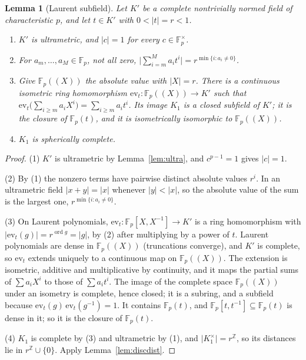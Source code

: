\documentclass[11pt]{amsart}
\newtheorem{lemma}[theorem]{Lemma}
\theoremstyle{definition}
\theoremstyle{remark}
\numberwithin{equation}{section}
\newcommand{\Z}{\mathbb{Z}}
\newcommand{\F}{\mathbb{F}}
\newcommand{\ord}{\operatorname{ord}}
\newcommand{\abs}[1]{\lvert #1\rvert}
\begin{document}
\begin{lemma}[Laurent subfield]\label{lem:laurentsub}
Let $K'$ be a complete nontrivially normed field of characteristic $p$, and let $t\in K'$ with $0<\abs t=r<1$.
\begin{enumerate}
\item $K'$ is ultrametric, and $\abs c=1$ for every $c\in\F_p^\times$.
\item For $a_m,\dots,a_M\in\F_p$, not all zero, $\bigl\lvert\sum_{i=m}^Ma_it^i\bigr\rvert=r^{\min\{i:a_i\ne0\}}$.
\item Give $\F_p((X))$ the absolute value with $\abs X=r$. There is a continuous isometric ring homomorphism
$\mathrm{ev}_t\colon\F_p((X))\to K'$ such that
$\mathrm{ev}_t\bigl(\sum_{i\ge m}a_iX^i\bigr)=\sum_{i\ge m}a_it^i$. Its image
$K_1$ is a closed subfield of $K'$; it is the closure of $\F_p(t)$, and it is isometrically isomorphic to $\F_p((X))$.
\item $K_1$ is spherically complete.
\end{enumerate}
\end{lemma}

\begin{proof}
(1) $K'$ is ultrametric by Lemma~\ref{lem:ultra}, and $c^{p-1}=1$ gives $\abs c=1$.

(2) By (1) the nonzero terms have pairwise distinct absolute values $r^i$. In an ultrametric field $\abs{x+y}=\abs x$
whenever $\abs y<\abs x$, so the absolute value of the sum is the largest one, $r^{\min\{i:a_i\neq0\}}$.

(3) On Laurent polynomials, $\mathrm{ev}_t\colon\F_p[X,X^{-1}]\to K'$ is a ring homomorphism with
$\abs{\mathrm{ev}_t(g)}=r^{\ord g}=\abs g$, by (2) after multiplying by a power of $t$. Laurent polynomials are dense in
$\F_p((X))$ (truncations converge), and $K'$ is complete, so $\mathrm{ev}_t$ extends uniquely to a continuous map on
$\F_p((X))$. The extension is isometric, additive and multiplicative by continuity, and it maps the partial sums of
$\sum a_iX^i$ to those of $\sum a_it^i$. The image of the complete space $\F_p((X))$ under an isometry is complete, hence
closed; it is a subring, and a subfield because $\mathrm{ev}_t(g)\,\mathrm{ev}_t(g^{-1})=1$. It contains $\F_p(t)$, and
$\F_p[t,t^{-1}]\subseteq\F_p(t)$ is dense in it; so it is the closure of $\F_p(t)$.

(4) $K_1$ is complete by (3) and ultrametric by (1), and $\abs{K_1^\times}=r^\Z$, so its distances lie in
$r^\Z\cup\{0\}$. Apply Lemma~\ref{lem:discdist}.
\end{proof}
\end{document}
